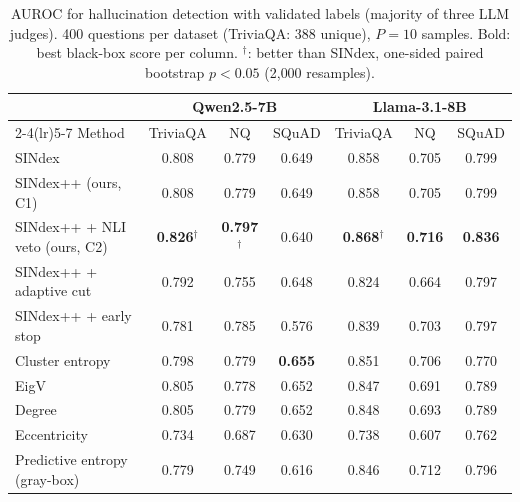 \begin{table}[t]\centering
\caption{AUROC for hallucination detection with validated labels (majority of three LLM judges). 400 questions per dataset (TriviaQA: 388 unique), $P{=}10$ samples. Bold: best black-box score per column. $^{\dagger}$: better than SINdex, one-sided paired bootstrap $p<0.05$ (2{,}000 resamples).}
\label{tab:main}\small
\begin{tabular}{lcccccc}\toprule
 & \multicolumn{3}{c}{Qwen2.5-7B} & \multicolumn{3}{c}{Llama-3.1-8B}\\
\cmidrule(lr){2-4}\cmidrule(lr){5-7}
Method & TriviaQA & NQ & SQuAD & TriviaQA & NQ & SQuAD\\\midrule
SINdex~\cite{abdaljalil2026sindex} & 0.808 & 0.779 & 0.649 & 0.858 & 0.705 & 0.799\\
SINdex++ (ours, C1) & 0.808 & 0.779 & 0.649 & 0.858 & 0.705 & 0.799\\
SINdex++ + NLI veto (ours, C2) & \textbf{0.826}$^{\dagger}$ & \textbf{0.797}$^{\dagger}$ & 0.640 & \textbf{0.868}$^{\dagger}$ & \textbf{0.716} & \textbf{0.836}\\
SINdex++ + adaptive cut & 0.792 & 0.755 & 0.648 & 0.824 & 0.664 & 0.797\\
SINdex++ + early stop & 0.781 & 0.785 & 0.576 & 0.839 & 0.703 & 0.797\\
\midrule
Cluster entropy & 0.798 & 0.779 & \textbf{0.655} & 0.851 & 0.706 & 0.770\\
EigV~\cite{lin2024generating} & 0.805 & 0.778 & 0.652 & 0.847 & 0.691 & 0.789\\
Degree~\cite{lin2024generating} & 0.805 & 0.779 & 0.652 & 0.848 & 0.693 & 0.789\\
Eccentricity~\cite{lin2024generating} & 0.734 & 0.687 & 0.630 & 0.738 & 0.607 & 0.762\\
Predictive entropy (gray-box) & 0.779 & 0.749 & 0.616 & 0.846 & 0.712 & 0.796\\
\bottomrule\end{tabular}\end{table}